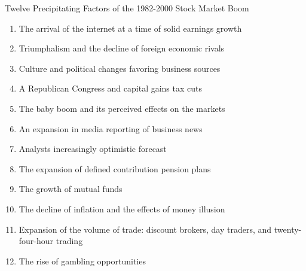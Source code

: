 \documentclass[11pt]{article}
\theoremstyle{definition}
\begin{document}
Twelve Precipitating Factors of the 1982-2000 Stock Market Boom
\begin{enumerate}
\item The arrival of the internet at a time of solid earnings growth
\item Triumphalism and the decline of foreign economic rivals
\item Culture and political changes favoring business sources
\item A Republican Congress and capital gains tax cuts
\item The baby boom and its perceived effects on the markets
\item An expansion in media reporting of business news
\item Analysts increasingly optimistic forecast
\item The expansion of defined contribution pension plans
\item The growth of mutual funds
\item The decline of inflation and the effects of money illusion
\item Expansion of the volume of trade: discount brokers, day traders, and twenty-four-hour trading
\item The rise of gambling opportunities
\end{enumerate}
\end{document}
